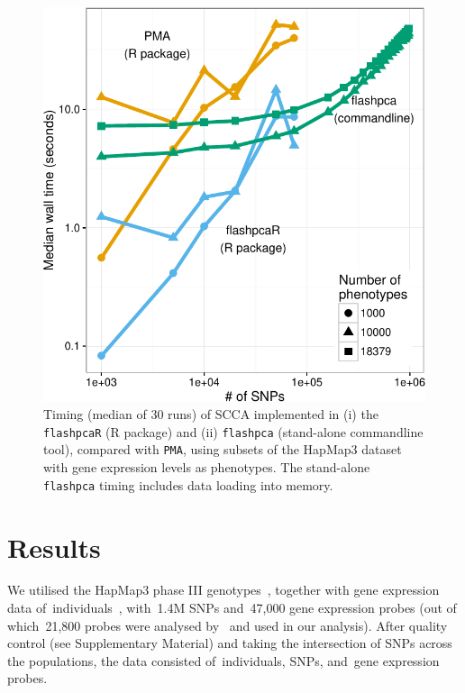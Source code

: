 \begin{methods}

\end{methods}

\begin{figure}[!tpb]
\centerline{\includegraphics[width=\figwidthp\textwidth]{scca_timing-crop.pdf}}
\caption{
Timing (median of 30 runs) of SCCA implemented in (i) the \texttt{flashpcaR}
(\textsf{R} package) and (ii) \texttt{flashpca} (stand-alone commandline tool),
compared with \texttt{PMA}, using subsets of the HapMap3 dataset with gene
expression levels as phenotypes. The stand-alone \texttt{flashpca} timing
includes data loading into memory.
}
\label{fig:01}
\end{figure}

\section{Results}

We utilised the HapMap3 phase III genotypes~\citep{hapmap2010}, together with
gene expression data of~\nindiv individuals~\citep{Stranger2012}, with~1.4M
SNPs and~47,000 gene expression probes (out of which~21,800 probes were
analysed by~\citet{Stranger2012} and used in our analysis). After quality
control (see Supplementary Material) and taking the intersection of SNPs
across the populations, the data consisted of~\nindiv individuals, \nsnps
SNPs, and~\ngenes gene expression probes.

